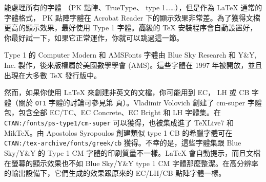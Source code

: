 
 能處理所有的字體 （PK 點陣、TrueType、 \PSi{}
type 1……），但是作為 \LaTeX{} 通常的字體格式， PK 點陣字體在 Acrobat
Reader 下的顯示效果非常差。為了獲得文檔更高的顯示效果，最好使用 \PSi{}
Type 1 字體。{\textbf
高級的 \TeX{} 安裝程序會自動設置好，你最好試一下，如果它正常運作，你就可以跳過這一節。}


\PSi{} Type 1 的 Computer Modern 和 AMSFonts 字體由 Blue Sky
Research 和 Y\&Y,
Inc. 製作，後來版權屬於美國數學學會 (AMS)。這些字體在 1997 年被開放，並且出現在大多數 \TeX{} 發行版中。


然而，如果你使用 \LaTeX{} 來創建非英文的文檔，你可能用到 EC， LH 或 CB 字體（關於
 \texttt{OT1} 字體的討論可參見第 \pageref{OT1} 頁）。Vladimir
Volovich 創建了 cm-super 字體包，包含全部 EC/TC、EC Concrete、EC
Bright 和 LH 字體集。在 \texttt{CTAN:/fonts/ps-type1/cm-super} 可以獲得，也被集成進了
 \TeX{}Live7 和 Mik\TeX\/。由 Apostolos Syropoulos 創建類似 type 1
CB 的希臘字體可在 \texttt{CTAN:/tex-archive/fonts/greek/cb} 獲得。不幸的是，這些字體集跟 Blue
Sky/Y\&Y 的 Type 1
CM 字體的印刷質量不一樣。\LaTeX{} 會自動提示，而且文檔在螢幕的顯示效果也不如 Blue
Sky/Y\&Y type 1
CM 字體那麼整潔。在高分辨率的輸出設備下，它們生成的效果跟原來的 EC/LH/CB 點陣字體一樣。

